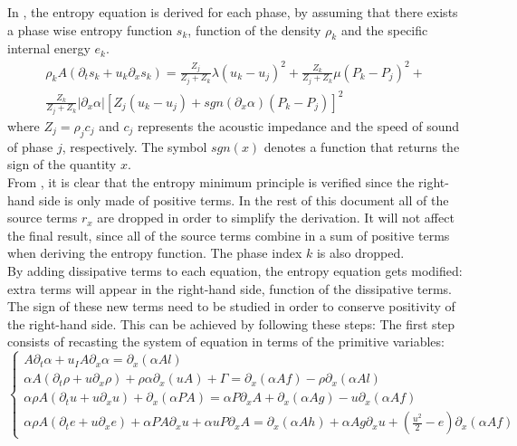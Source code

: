 In \cite{SEM}, the entropy equation is derived for each phase, by assuming that there exists a phase wise entropy function $s_k$, function of the density $\rho_k$ and the specific internal energy $e_k$.
\begin{eqnarray}
\label{eq:sev_equ2}
\rho_k A \left( \partial_t s_k + u_k \partial_x s_k \right) = \frac{Z_j}{Z_j+Z_k} \lambda \left( u_k - u_j \right)^2 + \frac{Z_k}{Z_j+Z_k} \mu \left( P_k-P_j \right)^2 + \nonumber \\ 
\frac{Z_k}{Z_j+Z_k} \left| \partial_x \alpha \right| \left[ Z_j \left( u_k-u_j \right) +sgn\left( \partial_x \alpha \right) \left( P_k-P_j \right) \right]^2
\end{eqnarray}
where $Z_j = \rho_j c_j$ and $c_j$ represents the acoustic impedance and the speed of sound of phase $j$, respectively. The symbol $sgn(x)$ denotes a function that returns the sign of the quantity $x$.\\
From , it is clear that the entropy minimum principle is verified since the right-hand side is only made of positive terms. In the rest of this document all of the source terms $r_x$ are dropped in order to simplify the derivation. It will not affect the final result, since all of the source terms combine in a sum of positive terms when deriving the entropy function. The phase index $k$ is also dropped.\\
By adding dissipative terms to each equation, the entropy equation gets modified: extra terms will appear in the right-hand side, function of the dissipative terms. The sign of these new terms need to be studied in order to conserve positivity of the right-hand side. This can be achieved by following these steps:
The first step consists of recasting the system of equation in terms of the primitive variables:
\begin{equation}
\label{eq:sev_equ3-bis}
\left\{
\begin{array}{llll}
A \partial_t  \alpha + u_I A \partial_x \alpha =  \partial_x \left( \alpha A l \right)\\
\alpha A \left( \partial_t \rho + u \partial_x  \rho \right) + \rho \alpha \partial_x \left( u A \right) + \Gamma = \partial_x\left( \alpha A f \right) - \rho \partial_x \left( \alpha A l \right) \\
\alpha \rho A \left( \partial_t u + u \partial_x u \right)  + \partial_x \left(\alpha P A \right) =  \alpha P \partial_x A + \partial_x\left( \alpha A g \right) - u \partial_x \left( \alpha A f \right) \\
\alpha \rho A  \left( \partial_t e +u  \partial_x e \right) + \alpha P A \partial_x u + \alpha u P \partial_x A = \partial_x \left( \alpha A h \right) + \alpha A g \partial_x u + \left( \frac{u^2}{2}-e \right) \partial_x \left( \alpha A f \right)
\end{array}
\right.
\end{equation}
